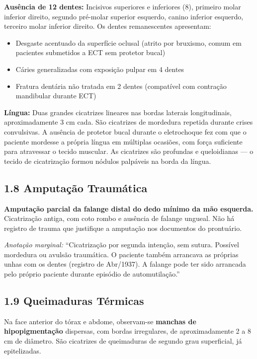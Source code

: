 \textbf{Ausência de 12 dentes:} Incisivos superiores e inferiores (8), primeiro molar inferior direito, segundo pré-molar superior esquerdo, canino inferior esquerdo, terceiro molar inferior direito. Os dentes remanescentes apresentam:

\begin{itemize}
    \item Desgaste acentuado da superfície oclusal (atrito por bruxismo, comum em pacientes submetidos a ECT sem protetor bucal)
    \item Cáries generalizadas com exposição pulpar em 4 dentes
    \item Fratura dentária não tratada em 2 dentes (compatível com contração mandibular durante ECT)
\end{itemize}

\textbf{Língua:} Duas grandes cicatrizes lineares nas bordas laterais longitudinais, aproximadamente 3 cm cada. São cicatrizes de mordedura repetida durante crises convulsivas. A ausência de protetor bucal durante o eletrochoque fez com que o paciente mordesse a própria língua em múltiplas ocasiões, com força suficiente para atravessar o tecido muscular. As cicatrizes são profundas e queloidianas --- o tecido de cicatrização formou nódulos palpáveis na borda da língua.

\subsection*{1.8 Amputação Traumática}

\textbf{Amputação parcial da falange distal do dedo mínimo da mão esquerda.} Cicatrização antiga, com coto rombo e ausência de falange ungueal. Não há registro de trauma que justifique a amputação nos documentos do prontuário.

\textit{Anotação marginal:} ``Cicatrização por segunda intenção, sem sutura. Possível mordedura ou avulsão traumática. O paciente também arrancava as próprias unhas com os dentes (registro de Abr/1937). A falange pode ter sido arrancada pelo próprio paciente durante episódio de automutilação.''

\subsection*{1.9 Queimaduras Térmicas}

Na face anterior do tórax e abdome, observam-se \textbf{manchas de hipopigmentação} dispersas, com bordas irregulares, de aproximadamente 2 a 8 cm de diâmetro. São cicatrizes de queimaduras de segundo grau superficial, já epitelizadas.

